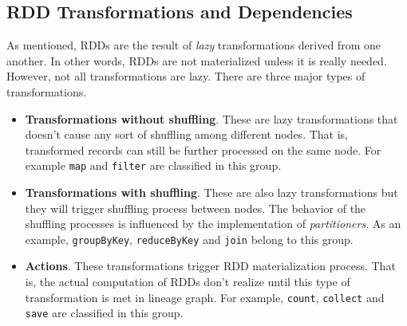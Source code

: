 \clearpage
\subsection{RDD Transformations and Dependencies}
\label{sp:depend}

As mentioned, RDDs are the result of \emph{lazy} transformations derived from one another. In other words, RDDs are not materialized unless it is really needed. However, not all transformations are lazy. There are three major types of transformations.
\begin{itemize}
    \item \textbf{Transformations without shuffling}. These are lazy transformations that doesn't cause any sort of shuffling among different nodes. That is, transformed records can still be further processed on the same node. For example \lstinline$map$ and \lstinline$filter$ are classified in this group.
    \item \textbf{Transformations with shuffling}. These are also lazy transformations but they will trigger shuffling process between nodes. The behavior of the shuffling processes is influenced by the implementation of \emph{partitioners}. As an example, \lstinline$groupByKey$, \lstinline$reduceByKey$ and \lstinline$join$ belong to this group.
    \item \textbf{Actions}. These transformations trigger RDD materialization process. That is, the actual computation of RDDs don't realize until this type of transformation is met in lineage graph. For example, \lstinline$count$, \lstinline$collect$ and \lstinline$save$ are classified in this group.
\end{itemize}

